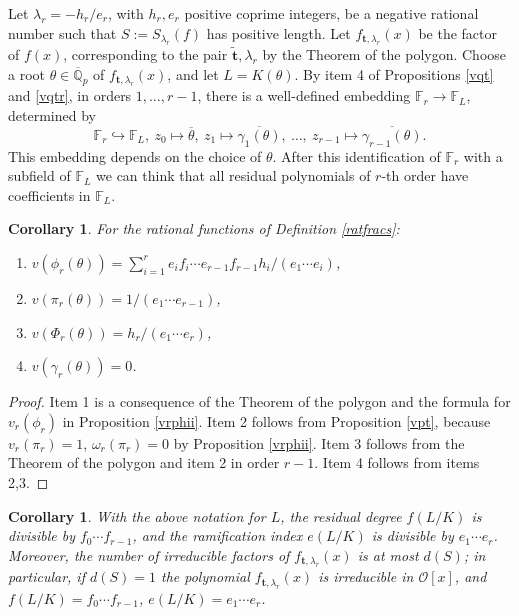 \documentclass{amsart}
\newtheorem{corollary}[theorem]{Corollary}
\def\ff#1{\mathbb{F}_{#1}}
\def\ga{\gamma}
\def\gb#1{\overline{\gamma_{#1}(\t)}}
\def\la{\lambda}
\def\lra{\longrightarrow}
\def\om{\omega}
\def\oo{{\mathcal O}}
\def\qpb{\overline{\mathbb{Q}}_p}
\def\t{\theta}
\def\tb{\overline{\theta}}
\def\ty{\mathbf{t}}
\def\zpx{\oo[x]}
\newcounter{cs}
\begin{document}
Let $\la_r=-h_r/e_r$, with $h_r,e_r$ positive coprime integers, be a negative rational number such that $S:=S_{\la_r}(f)$ has positive length. Let $f_{\ty,\la_r}(x)$ be the factor of $f(x)$, corresponding to the pair $\tilde{\ty},\la_r$ by the Theorem of the polygon. Choose a root $\t\in\qpb$ of $f_{\ty,\la_r}(x)$, and let $L=K(\t)$.
By item 4 of Propositions \ref{vqt} and \ref{vqtr}, in orders $1,\dots,r-1$, there is a well-defined embedding
 $\ff{r}\lra \ff{L}$, determined by 
\begin{equation}\label{embeddingr}
\ff{r}\hookrightarrow \ff{L}, \ z_0\mapsto \tb, \ z_1\mapsto \gb1,\ \dots,\ z_{r-1}\mapsto \gb{r-1}.
\end{equation}
This embedding depends on the choice of $\t$. After this identification of $\ff{r}$ with a subfield of $\ff{L}$ we can think that all residual polynomials of $r$-th order have coefficients in $\ff{L}$. 

\begin{corollary}\label{zerovalue}For the rational functions of Definition \ref{ratfracs}:
\begin{enumerate}
 \item $v(\phi_r(\t))=\sum_{i=1}^re_if_i\cdots e_{r-1}f_{r-1}h_i/(e_1\cdots e_i)$,
\item $v(\pi_r(\t))=1/(e_1\cdots e_{r-1})$,
\item $v(\Phi_r(\t))=h_r/(e_1 \cdots e_r)$,
\item $v(\ga_r(\t))=0$.
\end{enumerate}
\end{corollary}

\begin{proof}
Item 1 is a consequence of the Theorem of the polygon and the formula for $v_r(\phi_r)$ in Proposition \ref{vrphii}. 
Item 2 follows from Proposition \ref{vpt}, because $v_r(\pi_r)=1$, $\om_r(\pi_r)=0$ by Proposition \ref{vrphii}.
Item 3 follows from the Theorem of the polygon and item 2 in order $r-1$. Item 4 follows from items 2,3.
\end{proof}

\begin{corollary}\label{eeee}
With the above notation for $L$, the residual degree $f(L/K)$ is divisible by $f_0\cdots f_{r-1}$, and the ra\-mification index $e(L/K)$ is divisible by $e_1\cdots e_r$. Moreover, the number of irreducible factors of $f_{\ty,\la_r}(x)$ is at most $d(S)$; in particular, if $d(S)=1$ the polynomial $f_{\ty,\la_r}(x)$ is irreducible in $\zpx$, and $f(L/K)=f_0\cdots f_{r-1}$, $e(L/K)=e_1\cdots e_r$.
\end{corollary}
\end{document}
